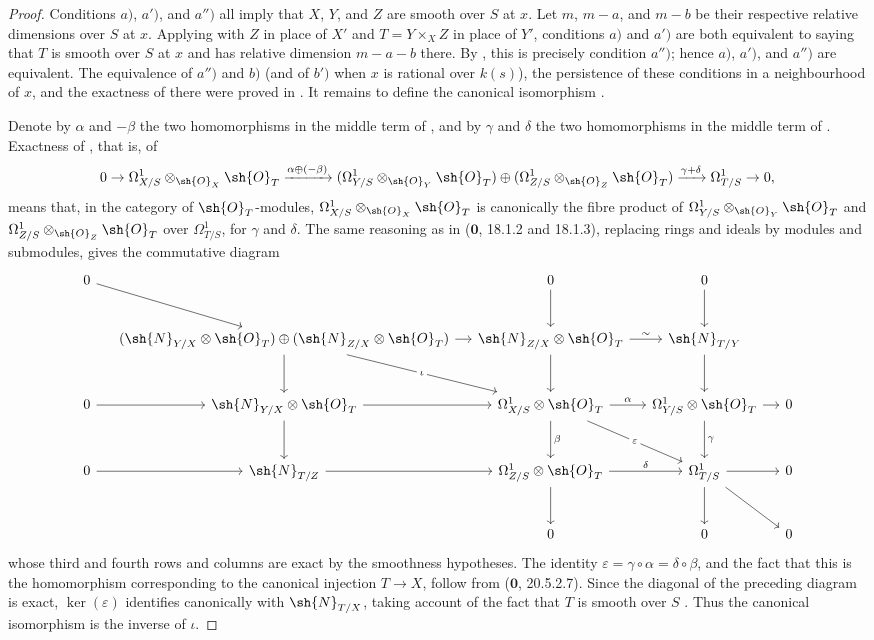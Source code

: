 \begin{proof}
Conditions $a)$, $a')$, and $a'')$ all imply that $X$, $Y$, and $Z$ are smooth over $S$ at $x$.
Let $m$, $m-a$, and $m-b$ be their respective relative dimensions over $S$ at $x$.
Applying  with $Z$ in place of $X'$ and $T=Y\times_XZ$ in place of $Y'$, conditions $a)$ and $a')$ are both equivalent to saying that $T$ is smooth over $S$ at $x$ and has relative dimension $m-a-b$ there.
By , this is precisely condition $a'')$; hence $a)$, $a')$, and $a'')$ are equivalent.
The equivalence of $a'')$ and $b)$ (and of $b')$ when $x$ is rational over $k(s)$), the persistence of these conditions in a neighbourhood of $x$, and the exactness of  there were proved in .
It remains to define the canonical isomorphism .


Denote by $\alpha$ and $-\beta$ the two homomorphisms in the middle term of , and by $\gamma$ and $\delta$ the two homomorphisms in the middle term of .
Exactness of , that is, of
\[
0\to\Omega^1_{X/S}\otimes_{\sh{O}_X}\sh{O}_T
\xrightarrow{\alpha\oplus(-\beta)}
(\Omega^1_{Y/S}\otimes_{\sh{O}_Y}\sh{O}_T)\oplus
(\Omega^1_{Z/S}\otimes_{\sh{O}_Z}\sh{O}_T)
\xrightarrow{\gamma+\delta}\Omega^1_{T/S}\to0,
\]
means that, in the category of $\sh{O}_T$-modules,
$\Omega^1_{X/S}\otimes_{\sh{O}_X}\sh{O}_T$ is canonically the fibre product of
$\Omega^1_{Y/S}\otimes_{\sh{O}_Y}\sh{O}_T$ and
$\Omega^1_{Z/S}\otimes_{\sh{O}_Z}\sh{O}_T$ over $\Omega^1_{T/S}$, for $\gamma$ and $\delta$.
The same reasoning as in ($\mathbf{0}$, 18.1.2 and 18.1.3), replacing rings and ideals by modules and submodules, gives the commutative diagram
{\scriptsize
\[
\begin{tikzcd}[column sep=small,row sep=large]
0 \ar[dr] & & 0 \ar[d] & 0 \ar[d] & \\
 & (\sh{N}_{Y/X}\otimes\sh{O}_T)\oplus(\sh{N}_{Z/X}\otimes\sh{O}_T)
   \ar[r] \ar[d] \ar[dr,"\iota" description]
 & \sh{N}_{Z/X}\otimes\sh{O}_T \ar[r,"\sim"] \ar[d]
 & \sh{N}_{T/Y} \ar[d] & \\
0 \ar[r] & \sh{N}_{Y/X}\otimes\sh{O}_T \ar[r] \ar[d]
 & \Omega^1_{X/S}\otimes\sh{O}_T \ar[r,"\alpha"] \ar[d,"\beta"] \ar[dr,"\varepsilon" description]
 & \Omega^1_{Y/S}\otimes\sh{O}_T \ar[r] \ar[d,"\gamma"] & 0 \\
0 \ar[r] & \sh{N}_{T/Z} \ar[r]
 & \Omega^1_{Z/S}\otimes\sh{O}_T \ar[r,"\delta"] \ar[d]
 & \Omega^1_{T/S} \ar[r] \ar[d] \ar[dr] & 0 \\
 & & 0 & 0 & 0
\end{tikzcd}
\]
}
whose third and fourth rows and columns are exact by the smoothness hypotheses.
The identity $\varepsilon=\gamma\circ\alpha=\delta\circ\beta$, and the fact that this is the homomorphism corresponding to the canonical injection $T\to X$, follow from ($\mathbf{0}$, 20.5.2.7).
Since the diagonal of the preceding diagram is exact, $\ker(\varepsilon)$ identifies canonically with $\sh{N}_{T/X}$, taking account of the fact that $T$ is smooth over $S$ .
Thus the canonical isomorphism  is the inverse of $\iota$.
\end{proof}

